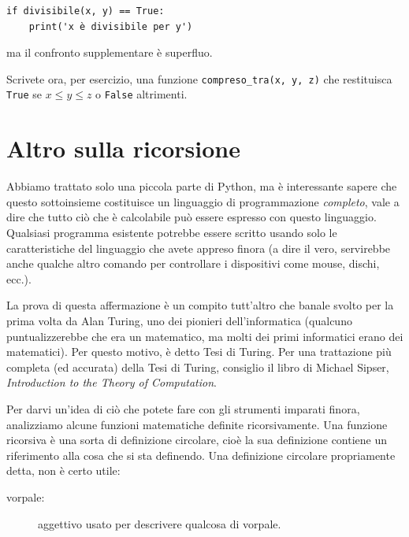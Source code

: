 \documentclass[10pt]{book}
\begin{document}
\begin{verbatim}
if divisibile(x, y) == True:
    print('x è divisibile per y')
\end{verbatim}
%
ma il confronto supplementare è superfluo.

Scrivete ora, per esercizio, una funzione \verb"compreso_tra(x, y, z)" che restituisca {\tt True} se $x \le y \le z$ o {\tt False} altrimenti.


\section{Altro sulla ricorsione}
\label{more.recursion}

Abbiamo trattato solo una piccola parte di Python, ma è interessante sapere che questo sottoinsieme costituisce un linguaggio di programmazione {\em completo}, vale a dire che tutto ciò che è calcolabile può essere espresso con questo linguaggio. Qualsiasi programma esistente potrebbe essere scritto usando solo le caratteristiche del linguaggio che avete appreso finora (a dire il vero, servirebbe anche qualche altro comando per controllare i dispositivi come mouse, dischi, ecc.).

La prova di questa affermazione è un compito tutt'altro che banale svolto per la prima volta da Alan Turing, uno dei pionieri dell'informatica (qualcuno puntualizzerebbe che era un matematico, ma molti dei primi informatici erano dei matematici). Per questo motivo, è detto Tesi di Turing.
Per una trattazione più completa (ed accurata) della Tesi di Turing, consiglio il libro di Michael Sipser, {\em Introduction to the Theory of Computation}.

Per darvi un'idea di ciò che potete fare con gli strumenti imparati finora, analizziamo alcune funzioni matematiche definite ricorsivamente. Una funzione ricorsiva è una sorta di definizione circolare, cioè la sua definizione contiene un riferimento alla cosa che si sta definendo. Una definizione circolare propriamente detta, non è certo utile:

\begin{description}

\item[vorpale:] aggettivo usato per descrivere qualcosa di vorpale.

\end{description}
\end{document}
